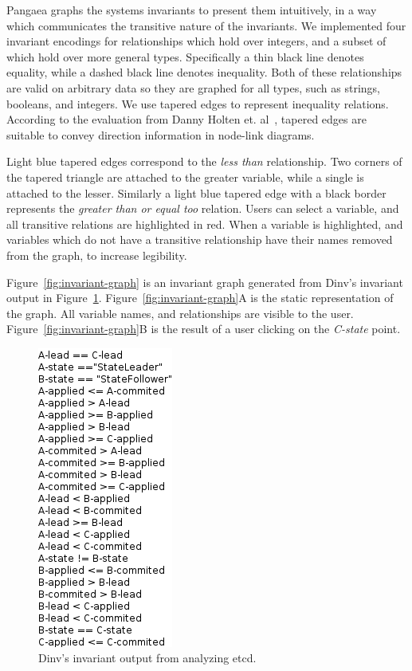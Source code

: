 Pangaea graphs the systems invariants to present them intuitively, in a
way which communicates the transitive nature of the invariants. We
implemented four invariant encodings for relationships which hold over
integers, and a subset of which hold over more general types.
Specifically a thin black line denotes equality, while a dashed black
line denotes inequality. Both of these relationships are valid on
arbitrary data so they are graphed for all types, such as strings,
booleans, and integers. 
We use tapered edges to represent inequality relations.  According to
the evaluation from Danny Holten et. al~\cite{holten2011extended}, tapered
edges are suitable to convey direction information in node-link diagrams.

Light blue tapered edges correspond to the
\emph{less than} relationship. Two corners of the tapered triangle are attached
to the greater variable, while a single is attached to the lesser.
Similarly a light blue tapered edge with a black border represents the
\emph{greater than or equal too} relation. Users can select a
variable, and all transitive relations are highlighted in red. When a
variable is highlighted, and variables which do not have a transitive
relationship have their names removed from the graph, to increase
legibility.

Figure~\ref{fig:invariant-graph} is an invariant graph generated from
Dinv's invariant output in Figure~\ref{fig:dinv-output}.
Figure~\ref{fig:invariant-graph}A is the static representation of the
graph.  All variable names, and relationships are visible to the
user. Figure~\ref{fig:invariant-graph}B is the result of a user clicking
on the \emph{C-state} point.

\begin{figure}[h]
    \includegraphics[width=0.5\linewidth]{fig/dinv-output}%
    \caption{Dinv's invariant output from analyzing etcd.\label{fig:dinv-output}}%
\end{figure}

